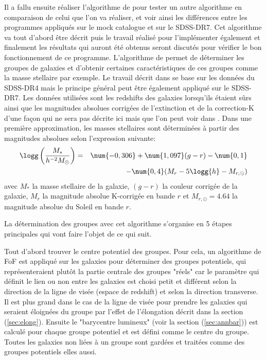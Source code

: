 Il a fallu ensuite réaliser l'algorithme de \citet{Yang+07} pour tester un autre algorithme en comparaison de celui que l'on va
réaliser, et voir ainsi les différences entre les programmes appliqués sur le mock catalogue et sur le SDSS-DR7.
Cet algorithme va tout d'abord être décrit puis le travail réalisé pour l'implémenter également et finalement les résultats qui
auront été obtenus seront discutés pour vérifier le bon fonctionnement de ce programme.
L'algorithme de \citet{Yang+07} permet de déterminer les groupes de galaxies et d'obtenir certaines caractéristiques de ces groupes
comme la masse stellaire par exemple. Le travail décrit dans \citet{Yang+07} se base sur les données du SDSS-DR4 mais le principe
général peut être également appliqué sur le SDSS-DR7. Les données utilisées sont les redshifts des galaxies lorsqu'ils étaient sûrs
ainsi que les magnitudes absolues corrigées de l'extinction et de la correction-K d'une façon qui ne sera pas décrite ici mais que
l'on peut voir dans \citet{Yang+07}. Dans une première approximation, les masses stellaires sont déterminées à partir des
magnitudes absolues selon l'expression suivante:
\begin{eqnarray}\label{eq:mstel}
        \logg\left(\frac{M_*}{{h^{-2}}{M_{\odot}}}\right)&=&\num{-0,306}+\num{1,097}(g-r)-\num{0,1}\nonumber\\
                                                         & &-\num{0,4}(M_r-5\logg{h}-M_{r,\odot})\nonumber\\
\end{eqnarray}
avec $M_*$ la masse stellaire de la galaxie, $(g-r)$ la couleur corrigée de la galaxie, $M_r$ la magnitude absolue K-corrigée
en bande $r$ et $M_{r,\odot}=\num{4,64}$ la magnitude absolue du Soleil en bande $r$.

La détermination des groupes avec cet algorithme s'organise en 5 étapes principales qui vont faire l'objet de ce qui suit.

 Tout d'abord trouver le centre potentiel des groupes. Pour cela, un algorithme de FoF est appliqué sur les
galaxies pour déterminer des groupes potentiels, qui représenteraient plutôt la partie centrale des groupes "réels" car le
paramètre qui définit le lien ou non entre les galaxies est choisi petit et différent selon la direction de la ligne de visée
(espace de redshift) et selon la direction transverse. Il est plus grand dans le cas de la ligne de visée pour prendre les galaxies
qui seraient éloignées du groupe par l'effet de l'élongation décrit dans la section (\ref{sec:elong}). Ensuite le "barycentre
lumineux" (voir la section (\ref{sec:annbar})) est calculé pour chaque groupe potentiel et est défini comme le centre du groupe.
Toutes les galaxies non liées à un groupe sont gardées et traitées comme des groupes potentiels elles aussi.

